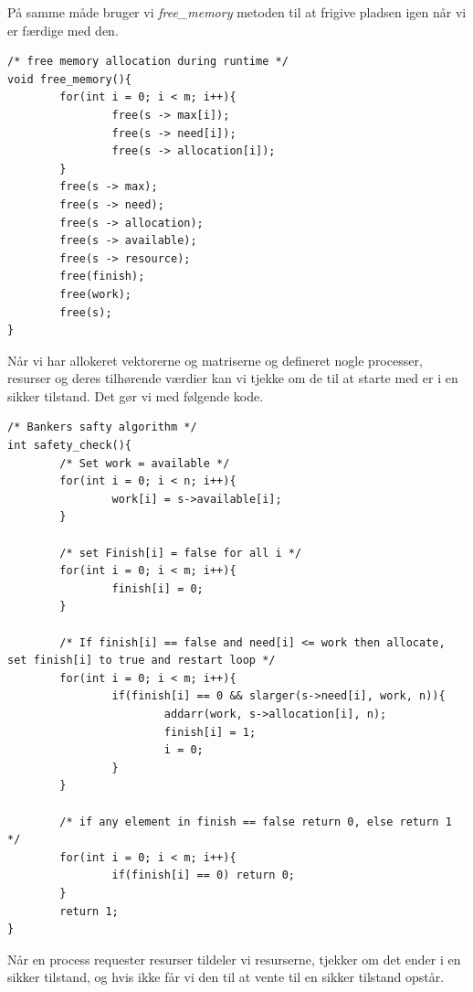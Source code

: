 \documentclass[danish]{report}
\begin{document}
På samme måde bruger vi \textit{free\_memory} metoden  til at frigive pladsen igen når vi er færdige med den.
\begin{lstlisting}
/* free memory allocation during runtime */
void free_memory(){
        for(int i = 0; i < m; i++){
                free(s -> max[i]);
                free(s -> need[i]);
                free(s -> allocation[i]);
        }
        free(s -> max);
        free(s -> need);
        free(s -> allocation);
        free(s -> available);
        free(s -> resource);
        free(finish);
        free(work);
        free(s);
}
\end{lstlisting}

Når vi har allokeret vektorerne og matriserne og defineret nogle processer, resurser og deres tilhørende værdier kan vi tjekke om de til at starte med er i en sikker tilstand. Det gør vi med følgende kode.

\begin{lstlisting}
/* Bankers safty algorithm */
int safety_check(){
        /* Set work = available */
        for(int i = 0; i < n; i++){
                work[i] = s->available[i];
        }

        /* set Finish[i] = false for all i */
        for(int i = 0; i < m; i++){
                finish[i] = 0;
        }

        /* If finish[i] == false and need[i] <= work then allocate, set finish[i] to true and restart loop */
        for(int i = 0; i < m; i++){
                if(finish[i] == 0 && slarger(s->need[i], work, n)){
                        addarr(work, s->allocation[i], n);
                        finish[i] = 1;
                        i = 0;
                }
        }

        /* if any element in finish == false return 0, else return 1  */
        for(int i = 0; i < m; i++){
                if(finish[i] == 0) return 0;
        }
        return 1;
}
\end{lstlisting}


Når en process requester resurser tildeler vi resurserne, tjekker om det ender i en sikker tilstand, og hvis ikke får vi den til at vente til en sikker tilstand opstår.
\end{document}
